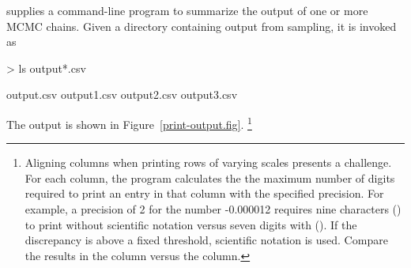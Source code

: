 \documentclass[article]{jss}
\begin{document}
 supplies a command-line program  to
summarize the output of one or more MCMC chains.  Given a directory
containing output from sampling, it is invoked as
%
\begin{CodeChunk}
\begin{CodeInput}
> ls output*.csv
\end{CodeInput}
\begin{CodeOutput}
output.csv	output1.csv	output2.csv	output3.csv
\end{CodeOutput}

\end{CodeChunk}
%
The output is shown in Figure~\ref{print-output.fig}.%
%
\footnote{Aligning columns when printing rows of varying scales
  presents a challenge.  For each column, the program calculates the
  the maximum number of digits required to print an entry in that
  column with the specified precision. For example, a precision of 2
  for the number -0.000012 requires nine characters ()
  to print without scientific notation versus seven digits with
  ().  If the discrepancy is above a fixed threshold,
  scientific notation is used.  Compare the results in the 
  column versus the  column.}
%
\end{document}
